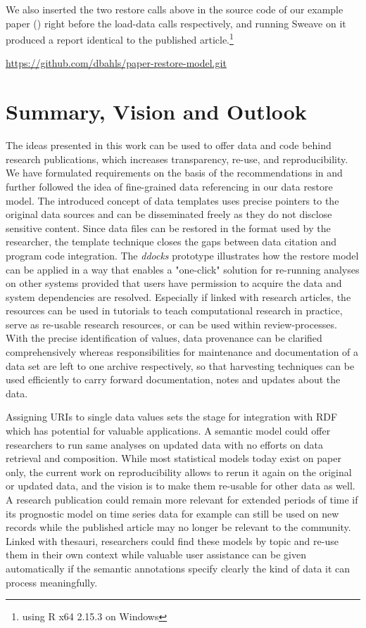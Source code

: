 \documentclass{acm_proc_article-sp}
\begin{document}
We also inserted the two restore calls above in the source code of our example paper (\cite{KoenkerZeileis2009}) right before the load-data calls respectively, and running Sweave on it produced a report identical to the published article.\footnote{using R x64 2.15.3 on Windows}


%
%
\url{https://github.com/dbahls/paper-restore-model.git}


\section{Summary, Vision and Outlook}\label{sec:outlook}


The ideas presented in this work can be used to offer data and code behind research publications, which increases transparency, re-use, and reproducibility.
We have formulated requirements on the basis of the recommendations in \cite{RePEc_ejw_journl_v_4_y_2007_i_3_p_326_337} and further followed the idea of fine-grained data referencing in our data restore model.
The introduced concept of data templates uses precise pointers to the original data sources and can be disseminated freely as they do not disclose sensitive content.
Since data files can be restored in the format used by the researcher, the template technique closes the gaps between data citation and program code integration.
The \textit{ddocks} prototype illustrates how the restore model can be applied in a way that enables a "one-click" solution for re-running analyses on other systems provided that users have permission to acquire the data and system dependencies are resolved.
Especially if linked with research articles, the resources can be used in tutorials to teach computational research in practice, serve as re-usable research resources, or can be used within review-processes.
With the precise identification of values, data provenance can be clarified comprehensively whereas responsibilities for maintenance and documentation of a data set are left to one archive respectively, so that harvesting techniques can be used efficiently to carry forward documentation, notes and updates about the data.



Assigning URIs to single data values sets the stage for integration with RDF which has potential for valuable applications.
A semantic model could offer researchers to run same analyses on updated data with no efforts on data retrieval and composition.
While most statistical models today exist on paper only, the current work on reproducibility allows to rerun it again on the original or updated data, and the vision is to make them re-usable for other data as well.
A research publication could remain more relevant for extended periods of time if its prognostic model on time series data for example can still be used on new records while the published article may no longer be relevant to the community.
Linked with thesauri, researchers could find these models by topic and re-use them in their own context while valuable user assistance can be given automatically if the semantic annotations specify clearly the kind of data it can process meaningfully.
\end{document}
